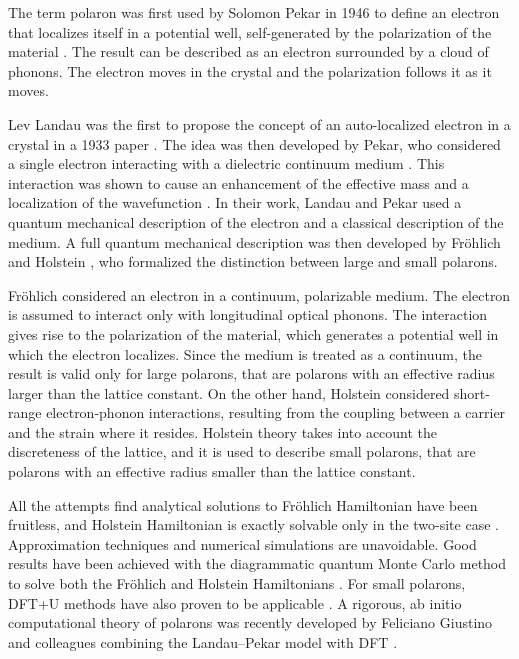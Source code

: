 The term polaron was first used by Solomon Pekar in 1946 to define an electron that localizes itself in a potential well, self-generated by the polarization of the material \cite{pekar1946}. The result can be described as an electron surrounded by a cloud of phonons. The electron moves in the crystal and the polarization follows it as it moves.

Lev Landau was the first to propose the concept of an auto-localized electron in a crystal in a 1933 paper \cite{terhaar1965}. The idea was then developed by Pekar, who considered a single electron interacting with a dielectric continuum medium \cite{pekar1946, pekar1947}. This interaction was shown to cause an enhancement of the effective mass and a localization of the wavefunction \cite{landau1948}. In their work, Landau and Pekar used a quantum mechanical description of the electron and a classical description of the medium. A full quantum mechanical description was then developed by Fr\"ohlich \cite{frohlich1950} and Holstein \cite{holstein1959}, who formalized the distinction between large and small polarons.

Fr\"ohlich considered an electron in a continuum, polarizable medium. The electron is assumed to interact only with longitudinal optical phonons. The interaction gives rise to the polarization of the material, which generates a potential well in which the electron localizes. Since the medium is treated as a continuum, the result is valid only for large polarons, that are polarons with an effective radius larger than the lattice constant. On the other hand, Holstein considered short-range electron-phonon interactions, resulting from the coupling between a carrier and the strain where it resides. Holstein theory takes into account the discreteness of the lattice, and it is used to describe small polarons, that are polarons with an effective radius smaller than the lattice constant.

All the attempts find analytical solutions to Fr\"ohlich Hamiltonian have been fruitless, and Holstein Hamiltonian is exactly solvable only in the two-site case \cite{rongsheng2002}. Approximation techniques and numerical simulations are unavoidable. Good results have been achieved with the diagrammatic quantum Monte Carlo method to solve both the Fr\"ohlich and Holstein Hamiltonians \cite{prokofev1998,mishchenko2000}. For small polarons, DFT+U methods have also proven to be applicable \cite{kokott2018}. A rigo­rous, ab initio computational theory of polarons was recently developed by Feliciano Giustino and colleagues combining the Landau–Pekar model with DFT \cite{sio2019}.

